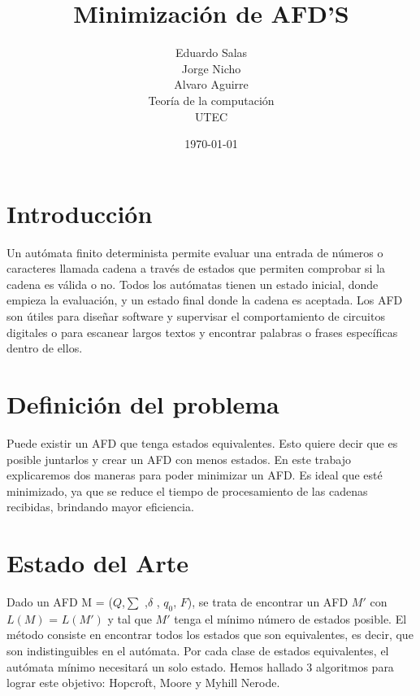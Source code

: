 \documentclass[12pt]{article}
\title{Minimizaci\'on de AFD'S}
\author{Eduardo Salas\\ 
Jorge Nicho\\
Alvaro Aguirre\\
Teor\'ia de la computaci\'on\\ 
\textsc{UTEC}
}
\date{\today}
\begin{document}
\setlength{\droptitle}{-5em}    
\maketitle


\section*{Introducci\'on}

Un autómata finito determinista permite evaluar una entrada de números o caracteres llamada cadena a través de estados que permiten comprobar si la cadena es válida o no. Todos los autómatas tienen un estado inicial, donde empieza la evaluación, y un estado final donde la cadena es aceptada. Los AFD son útiles para diseñar software y supervisar el comportamiento de circuitos digitales o para escanear largos textos y encontrar palabras o frases específicas dentro de ellos.

\section*{Definici\'on del problema}

Puede existir un AFD que tenga estados equivalentes. Esto quiere decir que es posible juntarlos y crear un AFD con menos estados. En este trabajo explicaremos dos maneras para poder minimizar un AFD. Es ideal que esté minimizado, ya que se reduce el tiempo de procesamiento de las cadenas recibidas, brindando mayor eficiencia.



\section{Estado del Arte}

Dado un AFD M = ($Q$,$\sum$ ,$\delta$ , $q_0$, $F$), se trata de encontrar un AFD $M'$ con $L(M)$ = $L(M' )$   y tal que $M'$ tenga el m\'inimo n\'umero de estados posible.
El m\'etodo consiste en encontrar todos los estados que son equivalentes, es decir, que son indistinguibles en el aut\'omata. Por cada clase de estados equivalentes, el aut\'omata m\'inimo necesitar\'a un solo estado.
Hemos hallado 3 algoritmos para lograr este objetivo: Hopcroft, Moore y Myhill Nerode.
\end{document}
